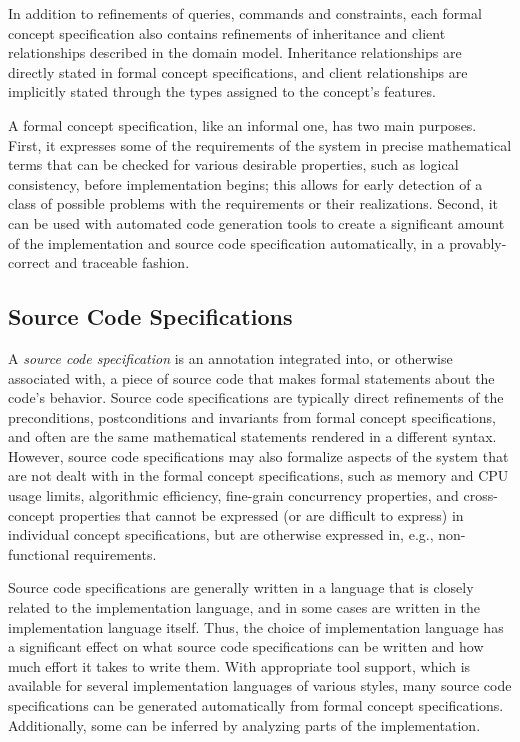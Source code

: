 In addition to refinements of queries, commands and constraints, each
formal concept specification also contains refinements of inheritance
and client relationships described in the domain model. Inheritance
relationships are directly stated in formal concept specifications,
and client relationships are implicitly stated through the types
assigned to the concept's features.

A formal concept specification, like an informal one, has two main
purposes. First, it expresses some of the requirements of the system
in precise mathematical terms that can be checked for various
desirable properties, such as logical consistency, before
implementation begins; this allows for early detection of a class of
possible problems with the requirements or their realizations. Second,
it can be used with automated code generation tools to create a
significant amount of the implementation and source code specification
automatically, in a provably-correct and traceable fashion.

\subsection{Source Code Specifications}

A \emph{source code specification} is an annotation integrated into,
or otherwise associated with, a piece of source code that makes formal
statements about the code's behavior. Source code specifications are
typically direct refinements of the preconditions, postconditions and
invariants from formal concept specifications, and often are the same
mathematical statements rendered in a different syntax. However,
source code specifications may also formalize aspects of the system
that are not dealt with in the formal concept specifications, such as
memory and CPU usage limits, algorithmic efficiency, fine-grain
concurrency properties, and cross-concept properties that cannot be
expressed (or are difficult to express) in individual concept
specifications, but are otherwise expressed in, e.g., non-functional
requirements.

Source code specifications are generally written in a language that is
closely related to the implementation language, and in some cases are
written in the implementation language itself. Thus, the choice of
implementation language has a significant effect on what source code
specifications can be written and how much effort it takes to write
them. With appropriate tool support, which is available for several
implementation languages of various styles, many source code
specifications can be generated automatically from formal concept
specifications. Additionally, some can be inferred by analyzing parts
of the implementation.

